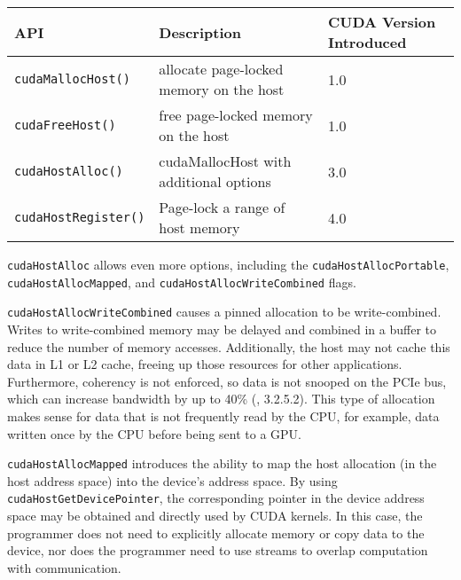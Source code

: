 \begin{table}[h]
	\centering
	\caption[CUDA Pinned Memory-Management APIs]{}
	\label{tab:cuda-pinned-apis}
	\begin{tabularx}{\textwidth}{|M{1.5in}|Y|M{0.9in}|}
		\hline
		\textbf{API}                & \textbf{Description}                    & \textbf{CUDA Version Introduced} \\ \hline
		\texttt{cudaMallocHost()}   & allocate page-locked memory on the host & 1.0~\cite{nvidia2007cuda10} \\ \hline
		\texttt{cudaFreeHost()}     & free page-locked memory on the host     & 1.0~\cite{nvidia2007cuda10} \\ \hline
		\texttt{cudaHostAlloc()}    & cudaMallocHost with additional options  & 3.0~\cite{nvidia2010cuda30} \\ \hline
		\texttt{cudaHostRegister()} & Page-lock a range of host memory        & 4.0~\cite{nvidia2011cudac40} \\ \hline
	\end{tabularx}
\end{table}

\texttt{cudaHostAlloc} allows even more options, including the \texttt{cudaHostAllocPortable}, \texttt{cudaHostAllocMapped}, and \texttt{cudaHostAllocWriteCombined} flags.

\texttt{cudaHostAllocWriteCombined} causes a pinned allocation to be write-combined.
Writes to write-combined memory may be delayed and combined in a buffer to reduce the number of memory accesses.
Additionally, the host may not cache this data in L1 or L2 cache, freeing up those resources for other applications. 
Furthermore, coherency is not enforced, so data is not snooped on the PCIe bus, which can increase bandwidth by up to 40\% (\cite{nvidia2010cuda30}, 3.2.5.2).
This type of allocation makes sense for data that is not frequently read by the CPU, for example, data written once by the CPU before being sent to a GPU.

\texttt{cudaHostAllocMapped} introduces the ability to map the host allocation (in the host address space) into the device's address space.
By using \texttt{cudaHostGetDevicePointer}, the corresponding pointer in the device address space may be obtained and directly used by CUDA kernels.
In this case, the programmer does not need to explicitly allocate memory or copy data to the device, nor does the programmer need to use streams to overlap computation with communication.


